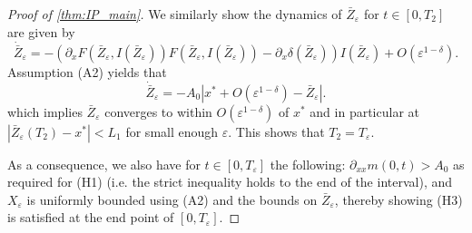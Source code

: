 \documentclass[]{article}
\theoremstyle{remark}
\begin{document}
\begin{proof}[{Proof of \cref{thm:IP_main}}]
We similarly show the dynamics of $\bar{Z}_\varepsilon$ for $t\in[0,T_2]$ are given by
\begin{equation}\label{eq:trait_dynamics_approxim}
    \dot{\bar{Z}}_\varepsilon=-(\partial_{x}F(\bar{Z}_\varepsilon,I(\bar{Z}_\varepsilon))F(\bar{Z}_\varepsilon,I(\bar{Z}_\varepsilon))-\partial_{x}\delta(\bar{Z}_\varepsilon))I(\bar{Z}_\varepsilon)+O(\varepsilon^{1-\delta}).
\end{equation}
Assumption (A2)  yields that
\begin{equation}\label{eq:trait_dynamics_approxim}
    \dot{\bar{Z}}_\varepsilon=-A_0|x^{*}+O(\varepsilon^{1-\delta})-\bar{Z}_\varepsilon|.
\end{equation}
which implies $\bar{Z}_\varepsilon$ converges to within $O(\varepsilon^{1-\delta})$ of $x^{*}$ and in particular at $|\bar{Z}_\varepsilon(T_2)-x^{*}|<L_1$ for small enough $\varepsilon$. This shows that $T_2=T_\varepsilon$.

As a consequence, we also have for $t\in[0,T_\varepsilon]$ the following: $\partial_{xx}m(0,t)>A_0$ as required for (H1) (i.e. the strict inequality holds to the end of the interval), and $X_\varepsilon$ is uniformly bounded using (A2) and the bounds on $\bar{Z}_\varepsilon$, thereby showing (H3) is satisfied at the end point of $[0,T_\varepsilon]$.



\end{proof}
\end{document}
